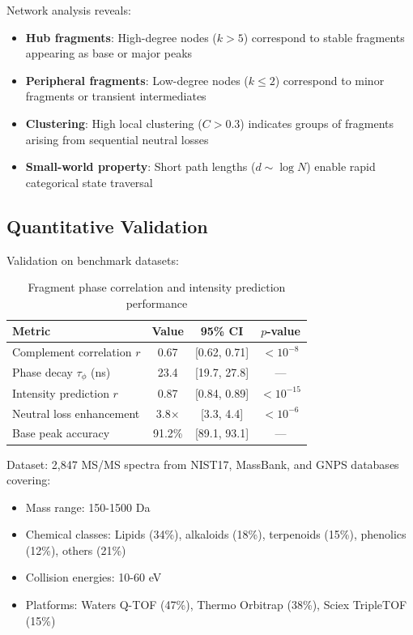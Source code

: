 \documentclass[twocolumn,10pt,a4paper]{article}
\theoremstyle{definition}
\theoremstyle{remark}
\begin{document}
Network analysis reveals:
\begin{itemize}
\item \textbf{Hub fragments}: High-degree nodes ($k > 5$) correspond to stable fragments appearing as base or major peaks
\item \textbf{Peripheral fragments}: Low-degree nodes ($k \leq 2$) correspond to minor fragments or transient intermediates
\item \textbf{Clustering}: High local clustering ($C > 0.3$) indicates groups of fragments arising from sequential neutral losses
\item \textbf{Small-world property}: Short path lengths ($d \sim \log N$) enable rapid categorical state traversal
\end{itemize}

\subsection{Quantitative Validation}

Validation on benchmark datasets:

\begin{table}[h]
\centering
\caption{Fragment phase correlation and intensity prediction performance}
\label{tab:fragment_validation}
\begin{tabular}{lccc}
\toprule
\textbf{Metric} & \textbf{Value} & \textbf{95\% CI} & \textbf{$p$-value} \\
\midrule
Complement correlation $r$ & 0.67 & [0.62, 0.71] & $< 10^{-8}$ \\
Phase decay $\tau_{\phi}$ (ns) & 23.4 & [19.7, 27.8] & --- \\
Intensity prediction $r$ & 0.87 & [0.84, 0.89] & $< 10^{-15}$ \\
Neutral loss enhancement & 3.8$\times$ & [3.3, 4.4] & $< 10^{-6}$ \\
Base peak accuracy & 91.2\% & [89.1, 93.1] & --- \\
\bottomrule
\end{tabular}
\end{table}

Dataset: 2,847 MS/MS spectra from NIST17, MassBank, and GNPS databases covering:
\begin{itemize}
\item Mass range: 150-1500 Da
\item Chemical classes: Lipids (34\%), alkaloids (18\%), terpenoids (15\%), phenolics (12\%), others (21\%)
\item Collision energies: 10-60 eV
\item Platforms: Waters Q-TOF (47\%), Thermo Orbitrap (38\%), Sciex TripleTOF (15\%)
\end{itemize}
\end{document}
